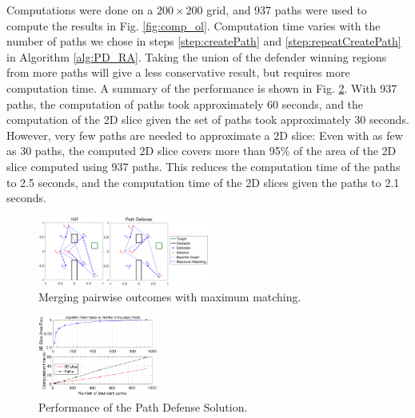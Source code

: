 Computations were done on a $200\times200$ grid, and 937 paths were used to compute the results in Fig. \ref{fig:comp_ol}. Computation time varies with the number of paths we chose in steps \ref{step:createPath} and \ref{step:repeatCreatePath} in Algorithm \ref{alg:PD_RA}. Taking the union of the defender winning regions from more paths will give a less conservative result, but requires more computation time. A summary of the performance is shown in Fig. \ref{fig:pd_perf}. With 937 paths, the computation of paths took approximately 60 seconds, and the computation of the 2D slice given the set of paths took approximately 30 seconds. However, very few paths are needed to approximate a 2D slice: Even with as few as 30 paths, the computed 2D slice covers more than 95\% of the area of the 2D slice computed using 937 paths. This reduces the computation time of the paths to 2.5 seconds, and the computation time of the 2D slices given the paths to 2.1 seconds.



\begin{figure}
	\centering
	\includegraphics[width=0.5\textwidth]{"fig/OLGame_mm_results"}
	\caption{Merging pairwise outcomes with maximum matching.}
	\label{fig:mm}
\end{figure}

\begin{figure}
	\centering
	\includegraphics[width=0.35\textwidth]{"fig/alg_perf_Rc"}
	\caption{Performance of the Path Defense Solution.}
	\label{fig:pd_perf}
\end{figure}

